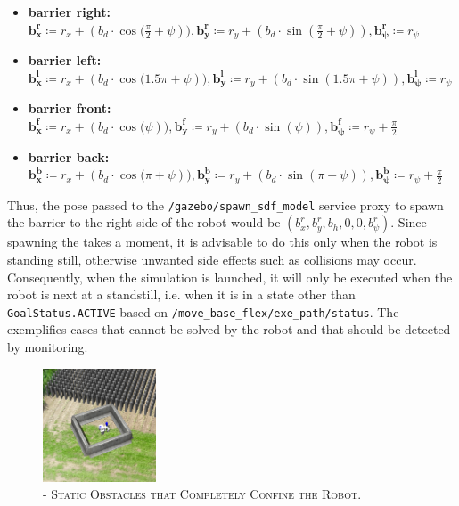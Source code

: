 \documentclass[english, master, utf8]{base/thesis_KBS}
\newcommand{\code}[1]{\colorbox{light-gray}{\texttt{#1}}}
\begin{document}
\begin{itemize}
    \item \textbf{barrier right:} $\boldsymbol{b_x^r} \coloneqq r_x + (b_d \cdot \cos{(\frac{\pi}{2} + \psi})), \boldsymbol{b_y^r} \coloneqq r_y + (b_d \cdot \sin{(\frac{\pi}{2} + \psi)}), \boldsymbol{b_\psi^r} \coloneqq r_\psi$
    \item \textbf{barrier left:} $\boldsymbol{b_x^l} \coloneqq r_x + (b_d \cdot \cos{(1.5 \pi + \psi})), \boldsymbol{b_y^l} \coloneqq r_y + (b_d \cdot \sin{(1.5 \pi + \psi)}), \boldsymbol{b_\psi^l} \coloneqq r_\psi$
    \item \textbf{barrier front:} $\boldsymbol{b_x^f} \coloneqq r_x + (b_d \cdot \cos{(\psi})), \boldsymbol{b_y^f} \coloneqq r_y + (b_d \cdot \sin{(\psi)}), \boldsymbol{b_\psi^f} \coloneqq r_\psi + \frac{\pi}{2}$
    \item \textbf{barrier back:} $\boldsymbol{b_x^b} \coloneqq r_x + (b_d \cdot \cos{(\pi + \psi})), \boldsymbol{b_y^b} \coloneqq r_y + (b_d \cdot \sin{(\pi + \psi)}), \boldsymbol{b_\psi^b} \coloneqq r_\psi + \frac{\pi}{2}$
\end{itemize}
Thus, the pose passed to the \code{/gazebo/spawn\_sdf\_model} service proxy to spawn the barrier to the right side of the robot would be $(b_x^r, b_y^r, b_h, 0, 0, b_\psi^r)$.
Since spawning the  takes a moment, it is advisable to do this only when the robot is standing still, otherwise unwanted side effects such as collisions may
occur. Consequently, when the simulation is launched, it will only be executed when the robot is next at a standstill, i.e. when it is in a state other than \code{GoalStatus.ACTIVE}
based on \code{/move\_base\_flex/exe\_path/status}. The  exemplifies cases that cannot be solved by the robot and that should be detected by monitoring.
\begin{figure}[H]
    \centering
    \includegraphics[width=0.3\textwidth]{pics/robot_prison.png}
    \caption{\textsc{ - Static Obstacles that Completely Confine the Robot.}}
    \label{fig:robot_prison}
\end{figure}
\end{document}
